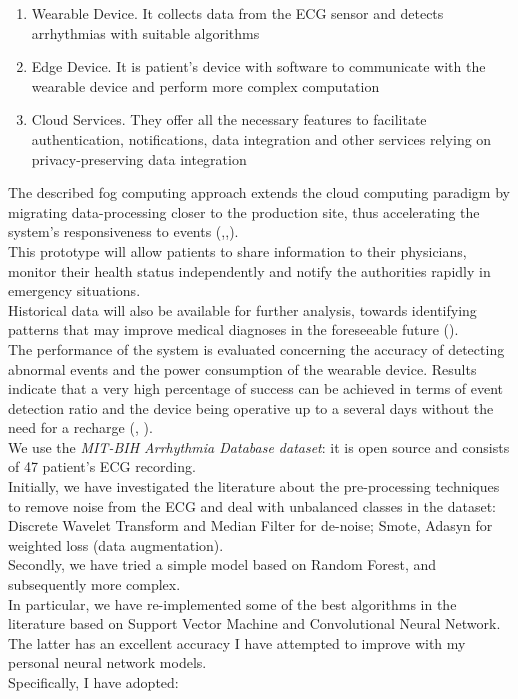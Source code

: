 \documentclass[LaM,binding=0.6cm]{sapthesis}
\begin{document}
\begin{enumerate}
\item Wearable Device. It collects data from the ECG sensor and detects arrhythmias with suitable algorithms
\item Edge Device. It is patient's device with software to communicate with the wearable device and perform more complex computation
\item Cloud Services. They offer all the necessary features to facilitate authentication, notifications, data integration and other services relying on privacy-preserving data integration
\end{enumerate}
The described fog computing approach extends the cloud computing paradigm by migrating data-processing closer to the production site, thus accelerating the system's responsiveness to events (\cite{ufcf},\cite{ufcf2},\cite{fog}).\\This prototype will allow patients to share information to their physicians, monitor their health status independently and notify the authorities rapidly in emergency situations.\\Historical data will also be available for further analysis, towards identifying patterns that may improve medical diagnoses in the foreseeable future (\cite{otdo}).\\The performance of the system is evaluated concerning the accuracy of detecting abnormal events and the power consumption of the wearable device. Results indicate that a very high percentage of success can be achieved in terms of event detection ratio and the device being operative up to a several days without the need for a recharge (\cite{potf}, \cite{aoat}).\\We use the \textit{MIT-BIH Arrhythmia Database dataset}: it is open source and consists of 47 patient's ECG recording.\\Initially, we have investigated the literature about the pre-processing techniques to remove noise from the ECG and deal with unbalanced classes in the dataset: Discrete Wavelet Transform and Median Filter for de-noise; Smote, Adasyn for weighted loss (data augmentation).\\Secondly, we have tried a simple model based on Random Forest, and subsequently more complex.\\In particular, we have re-implemented some of the best algorithms in the literature based on Support Vector Machine and Convolutional Neural Network. The latter has an excellent accuracy I have attempted to improve with my personal neural network models.\\Specifically, I have adopted:
\end{document}
